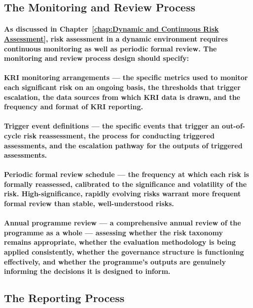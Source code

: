 \subsection{The Monitoring and Review Process}
\paragraph{As discussed in Chapter~\ref{chap:Dynamic and Continuous Risk Assessment}, risk assessment in a dynamic environment requires continuous monitoring as well as periodic formal review. The monitoring and review process design should specify:}
\paragraph{\textbf{KRI monitoring arrangements} — the specific metrics used to monitor each significant risk on an ongoing basis, the thresholds that trigger escalation, the data sources from which KRI data is drawn, and the frequency and format of KRI reporting.}
\paragraph{\textbf{Trigger event definitions} — the specific events that trigger an out-of-cycle risk reassessment, the process for conducting triggered assessments, and the escalation pathway for the outputs of triggered assessments.}
\paragraph{\textbf{Periodic formal review schedule} — the frequency at which each risk is formally reassessed, calibrated to the significance and volatility of the risk. High-significance, rapidly evolving risks warrant more frequent formal review than stable, well-understood risks.}
\paragraph{\textbf{Annual programme review} — a comprehensive annual review of the programme as a whole — assessing whether the risk taxonomy remains appropriate, whether the evaluation methodology is being applied consistently, whether the governance structure is functioning effectively, and whether the programme's outputs are genuinely informing the decisions it is designed to inform.}

\subsection{The Reporting Process}
